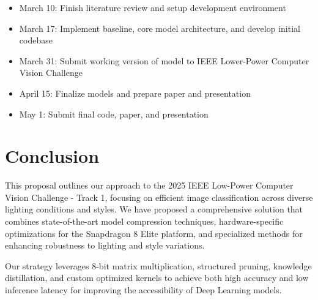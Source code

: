 \documentclass[11pt, oneside]{article}   	%
\begin{document}
\begin{itemize}
	\item March 10: Finish literature review and setup development environment
	\item March 17: Implement baseline, core model architecture, and develop initial codebase
	\item March 31: Submit working version of model to IEEE Lower-Power Computer Vision Challenge
	\item April 15: Finalize models and prepare paper and presentation
	\item May 1: Submit final code, paper, and presentation
\end{itemize}

\section*{Conclusion}

This proposal outlines our approach to the 2025 IEEE Low-Power Computer Vision Challenge - Track 1, focusing on efficient image classification across diverse lighting conditions and styles. We have proposed a comprehensive solution that combines state-of-the-art model compression techniques, hardware-specific optimizations for the Snapdragon 8 Elite platform, and specialized methods for enhancing robustness to lighting and style variations.

Our strategy leverages 8-bit matrix multiplication, structured pruning, knowledge distillation, and custom optimized kernels to achieve both high accuracy and low inference latency for improving the accessibility of Deep Learning models.



\printbibliography
\end{document}
